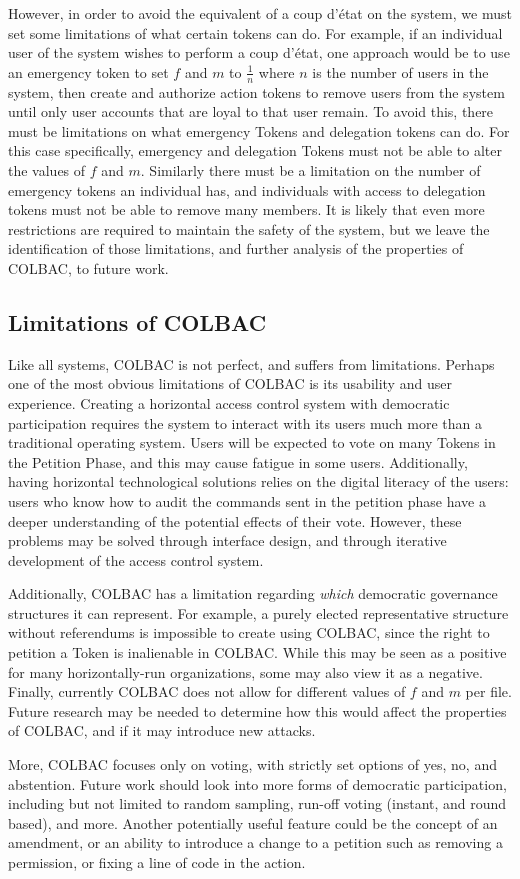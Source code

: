 However, in order to avoid the equivalent of a coup d'\'etat on the system, we
must set some limitations of what certain tokens can do. For example, if an 
individual user of the system wishes to perform a coup d'\'etat, one approach
would be to use an emergency token to set $f$ and $m$ to $\frac{1}{n}$ where $n$
is the number of users in the system, then create and authorize action tokens to
remove users from the system until only user accounts that are loyal to that
user remain. To avoid this, there must be limitations on what emergency Tokens
and delegation tokens can do. For this case specifically, emergency and
delegation Tokens must not be able to alter the values of $f$ and $m$. Similarly
there must be a limitation on the number of emergency tokens an individual has,
and individuals with access to delegation tokens must not be able to remove many
members. It is likely that even more restrictions are required to maintain the
safety of the system, but we leave the identification of those limitations, and
further analysis of the properties of COLBAC, to future work.

\subsection{Limitations of COLBAC}
\label{sec:colbaclimitations}
Like all systems, COLBAC is not perfect, and suffers from limitations. Perhaps
one of the most obvious limitations of COLBAC is its usability and user
experience. Creating a horizontal access control system with democratic
participation requires the system to interact with its users much more than a
traditional operating system. Users will be expected to vote on many Tokens in
the Petition Phase, and this may cause fatigue in some users. Additionally, 
having horizontal technological solutions relies on the digital literacy of the
users: users who know how to audit the commands sent in the petition phase have
a deeper understanding of the potential effects of their vote. However, these
problems may be solved through interface design, and through iterative
development of the access control system.

Additionally, COLBAC has a limitation regarding \textit{which} democratic governance structures
it can represent. For example, a purely elected representative structure without
referendums is impossible to create using COLBAC, since the right to petition
a Token is inalienable in COLBAC. While this may be seen as a positive for many
horizontally-run organizations, some may also view it as a negative. Finally,
currently COLBAC does not allow for different values of $f$ and $m$ per file.
Future research may be needed to determine how this would affect the properties
of COLBAC, and if it may introduce new attacks.

More, COLBAC focuses only on voting, with strictly set options of yes, no, and
abstention. Future work should look into more forms of democratic participation,
including but not limited to random sampling, run-off voting (instant, and
round based), and more. Another potentially useful feature could be the concept
of an amendment, or an ability to introduce a change to a petition such as
removing a permission, or fixing a line of code in the action.
